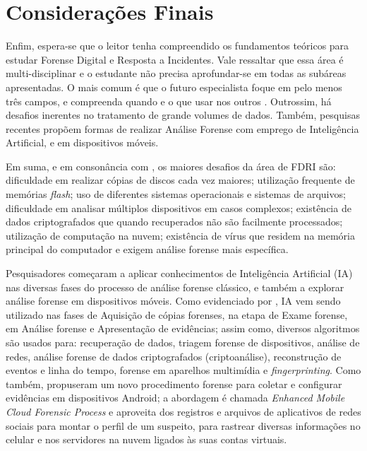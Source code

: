 \section{Considerações Finais}
    
    \vspace{10.5cm}

    \hspace{1cm}
    Enfim, espera-se que o leitor tenha compreendido os fundamentos teóricos para estudar Forense Digital e Resposta a Incidentes. Vale ressaltar que essa área é multi-disciplinar e o estudante não precisa aprofundar-se em todas as subáreas apresentadas. O mais comum é que o futuro especialista foque em pelo menos três campos, e compreenda quando e o que usar nos outros \cite{roberts2016}. Outrossim, há desafios inerentes no tratamento de grande volumes de dados. Também, pesquisas recentes propõem formas de realizar Análise Forense com emprego de Inteligência Artificial, e em dispositivos móveis.

    \vspace{4mm}

    \hspace{1cm}
    Em suma, e em consonância com , os maiores desafios da área de FDRI são: dificuldade em realizar cópias de discos cada vez maiores; utilização frequente de memórias \textit{flash}; uso de diferentes sistemas operacionais e sistemas de arquivos; dificuldade em analisar múltiplos dispositivos em casos complexos; existência de dados criptografados que quando recuperados não são facilmente processados; utilização de computação na nuvem; existência de vírus que residem na memória principal do computador e exigem análise forense mais específica.

    \vspace{4mm}

    \hspace{1cm}
    Pesquisadores começaram a aplicar conhecimentos de Inteligência Artificial (IA) nas diversas fases do processo de análise forense clássico, e também a explorar análise forense em dispositivos móveis. Como evidenciado por , IA vem sendo utilizado nas fases de Aquisição de cópias forenses, na etapa de Exame forense, em Análise forense e Apresentação de evidências; assim como, diversos algoritmos são usados para: recuperação de dados, triagem forense de dispositivos, análise de redes, análise forense de dados criptografados (criptoanálise), reconstrução de eventos e linha do tempo, forense em aparelhos multimídia e \textit{fingerprinting}. Como também,  propuseram um novo procedimento forense para coletar e configurar evidências em dispositivos Android; a abordagem é chamada \textit{Enhanced Mobile Cloud Forensic Process} e aproveita dos registros e arquivos de aplicativos de redes sociais para montar o perfil de um suspeito, para rastrear diversas informações no celular e nos servidores na nuvem ligados às suas contas virtuais.

\newpage